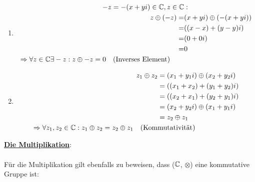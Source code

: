 \documentclass[../MAIN/main.tex]{subfiles}
\begin{document}
\begin{Beweis}
\begin{enumerate}[1)]
			\item \begin{align*}
	  					-z = -(x + yi) \in \mathbb{C}, z \in \mathbb{C} &: \\
								  z \oplus (-z) =& (x + yi) \oplus (-(x + yi)) \\
								  			  =& ((x - x) + (y - y)i) \\
											  =& (0 + 0i) \\
											  =& 0  \\
						\Rightarrow \forall z \in \mathbb{C} \exists -z: z \oplus -z = 0 \quad \text{(Inverses Element)} \qquad &
	  			  \end{align*}
			\item \begin{align*}
						z_1 \oplus z_2 &= (x_1 + y_1i) \oplus (x_2 + y_2i) \\
									   &= ((x_1 + x_2) + (y_1 + y_2)i) \\
									   &= ((x_2 + x_1) + (y_2 + y_1)i) \\
									   &= (x_2 + y_2i) \oplus (x_1 + y_1i) \\
									   &= z_2 \oplus z_1 \\
						\Rightarrow \forall z_1, z_2 \in \mathbb{C}: z_1 \oplus z_2 = z_2 \oplus z_1 \quad \text{(Kom}&\text{mutativität)}
				  \end{align*}
		\end{enumerate}
		\newpage
		\underline{\textbf{Die Multiplikation}}:

		\paragraph{} Für die Multiplikation gilt ebenfalls zu beweisen, dass ($\mathbb{C}$, $\otimes$) eine kommutative Gruppe ist:


\end{Beweis}
\end{document}
